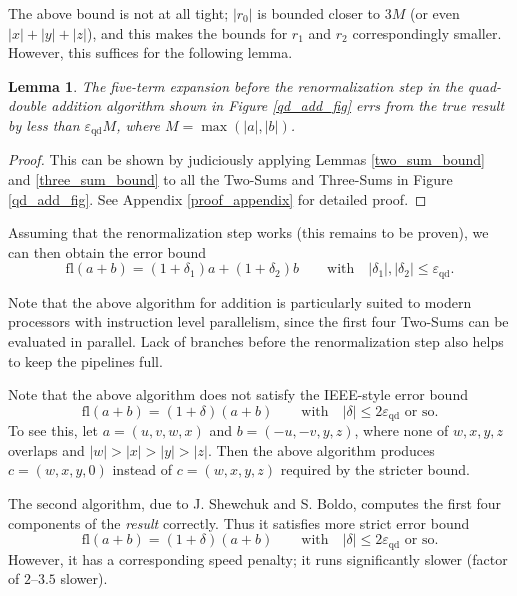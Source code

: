 \documentclass[11pt]{article}
\newtheorem{lem}[thm]{Lemma}
\theoremstyle{definition}
\newcommand{\fl}{\mathrm{fl}}
\newcommand{\epsqd}{\varepsilon_\mathrm{qd}}
\begin{document}
The above bound is not at all tight; $|r_0|$ is bounded closer
to $3M$ (or even $|x| + |y| + |z|$), and this makes the bounds for $r_1$ 
and $r_2$ correspondingly smaller.  However, this suffices for the
following lemma.

\begin{lem}\label{sum_lemma}
  The five-term expansion before the renormalization step in the
  quad-double addition algorithm shown in Figure \ref{qd_add_fig} errs 
  from the true result by less than $\epsqd M$, where $M = \max(|a|, |b|)$.
\end{lem}
\begin{proof}
This can be shown by
judiciously applying Lemmas \ref{two_sum_bound} and \ref{three_sum_bound}
to all the {\sc Two-Sum}s and {\sc Three-Sum}s in Figure \ref{qd_add_fig}.
See Appendix \ref{proof_appendix} for detailed proof.
\end{proof}

Assuming that the renormalization
step works (this remains to be proven), we can then obtain the error bound
\begin{displaymath}
  \fl(a+b) = (1 + \delta_1) a + (1 + \delta_2) b \qquad \textrm{with} \quad
  |\delta_1|, |\delta_2| \le \epsqd.
\end{displaymath}

Note that the above algorithm for addition is particularly suited to 
modern processors with instruction level parallelism, since the first
four {\sc Two-Sum}s can be evaluated in parallel.  Lack of branches 
before the renormalization step also helps to keep the pipelines full.

Note that the above algorithm does not satisfy the IEEE-style error
bound 
\begin{displaymath}
  \fl(a+b) = (1+\delta)(a+b) \qquad \textrm{with} \quad
  |\delta| \le 2\epsqd \textrm{ or so.}
\end{displaymath}
To see this, let $a = (u, v, w, x)$ and $b = (-u, -v, y, z)$, 
where none of $w, x, y, z$ overlaps and $|w| > |x| > |y| > |z|$.
Then the above algorithm produces $c = (w, x, y, 0)$ instead
of $c = (w, x, y, z)$ required by the stricter bound.

The second algorithm, due to J. Shewchuk and S. Boldo, computes the first
four components of the {\em result} correctly.  Thus it satisfies
more strict error bound
\begin{displaymath}
  \fl(a+b) = (1+\delta)(a+b) \qquad \textrm{with} \quad
  |\delta| \le 2\epsqd \textrm{ or so.}
\end{displaymath}
However, it has a corresponding speed penalty; it runs significantly slower
(factor of $2$--$3.5$ slower).
\end{document}
